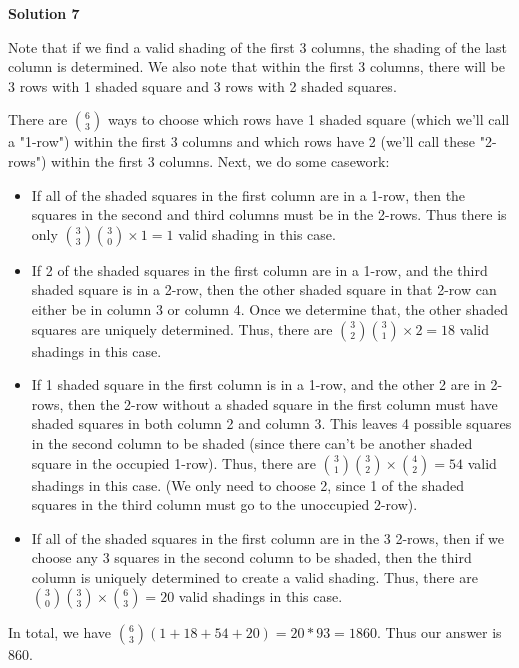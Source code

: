 \begin{enumerate}
\textbf{Solution 7}

Note that if we find a valid shading of the first 3 columns, the shading of the last column is determined. We also note that within the first 3 columns, there will be 3 rows with 1 shaded square and 3 rows with 2 shaded squares.

 There are ${6 \choose 3}$ ways to choose which rows have 1 shaded square (which we'll call a "1-row") within the first 3 columns and which rows have 2 (we'll call these "2-rows") within the first 3 columns. Next, we do some casework:

 
            \begin{itemize}
        \item If all of the shaded squares in the first column are in a 1-row, then the squares in the second and third columns must be in the 2-rows. Thus there is only ${3 \choose 3}{3 \choose 0} \times 1= 1$ valid shading in this case.
            \end{itemize}
            
            \begin{itemize}
        \item If 2 of the shaded squares in the first column are in a 1-row, and the third shaded square is in a 2-row, then the other shaded square in that 2-row can either be in column 3 or column 4. Once we determine that, the other shaded squares are uniquely determined. Thus, there are ${3 \choose 2}{3 \choose 1}\times 2=18$ valid shadings in this case.
            \end{itemize}
            
            \begin{itemize}
        \item If 1 shaded square in the first column is in a 1-row, and the other 2 are in 2-rows, then the 2-row without a shaded square in the first column must have shaded squares in both column 2 and column 3. This leaves 4 possible squares in the second column to be shaded (since there can't be another shaded square in the occupied 1-row). Thus, there are ${3 \choose 1}{3 \choose 2}\times {4 \choose 2}=54$ valid shadings in this case. (We only need to choose 2, since 1 of the shaded squares in the third column must go to the unoccupied 2-row).
            \end{itemize}
            
            \begin{itemize}
        \item If all of the shaded squares in the first column are in the 3 2-rows, then if we choose any 3 squares in the second column to be shaded, then the third column is uniquely determined to create a valid shading. Thus, there are ${3 \choose 0}{3 \choose 3}\times{6 \choose 3} = 20$ valid shadings in this case.
            \end{itemize}
            In total, we have ${6\choose3}(1+18+54+20)=20*93=1860$. Thus our answer is $\boxed{860}$.


\end{enumerate}
